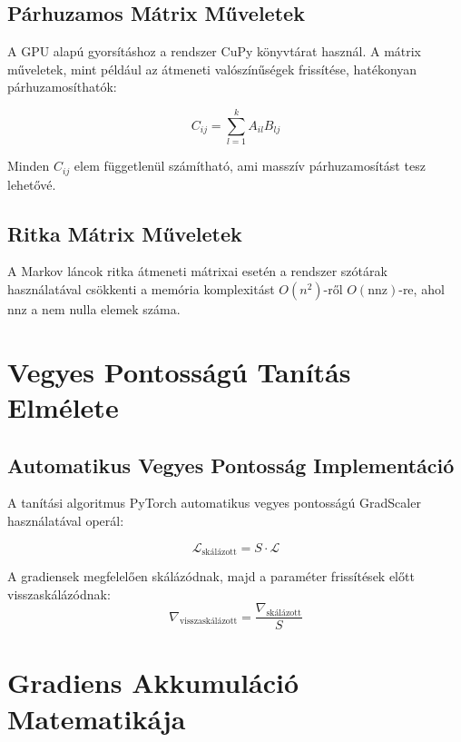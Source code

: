 \subsection{Párhuzamos Mátrix Műveletek}

A GPU alapú gyorsításhoz a rendszer CuPy könyvtárat használ. A mátrix műveletek, mint például az átmeneti valószínűségek frissítése, hatékonyan párhuzamosíthatók:

\begin{equation}
C_{ij} = \sum_{l=1}^k A_{il} B_{lj}
\end{equation}

Minden $C_{ij}$ elem függetlenül számítható, ami masszív párhuzamosítást tesz lehetővé.

\subsection{Ritka Mátrix Műveletek}

A Markov láncok ritka átmeneti mátrixai esetén a rendszer szótárak használatával csökkenti a memória komplexitást $O(n^2)$-ről $O(\text{nnz})$-re, ahol $\text{nnz}$ a nem nulla elemek száma.

\section{Vegyes Pontosságú Tanítás Elmélete}

\subsection{Automatikus Vegyes Pontosság Implementáció}

A tanítási algoritmus PyTorch automatikus vegyes pontosságú GradScaler használatával operál:

\begin{equation}
\mathcal{L}_{\text{skálázott}} = S \cdot \mathcal{L}
\end{equation}

A gradiensek megfelelően skálázódnak, majd a paraméter frissítések előtt visszaskálázódnak:
\begin{equation}
\nabla_{\text{visszaskálázott}} = \frac{\nabla_{\text{skálázott}}}{S}
\end{equation}

\section{Gradiens Akkumuláció Matematikája}

